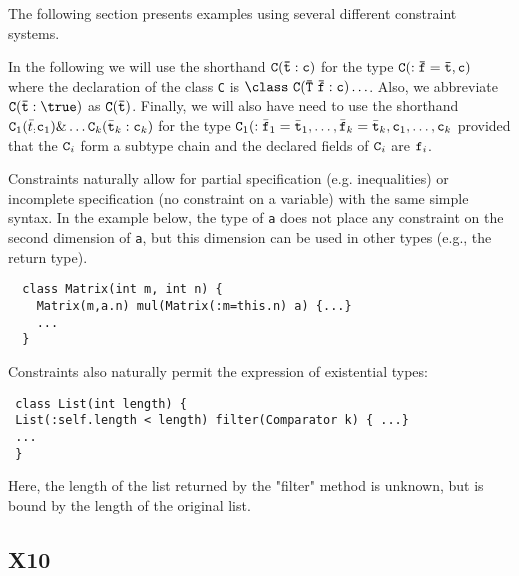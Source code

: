 %
%
%
%
%
%

The following section presents examples using several different
constraint systems.

In the following we will use the shorthand $\tt C(\bar{t}:c)$ for the
type $\tt C(:\bar{f}=\bar{t},c)$ where the declaration of the class
{\tt C} is $\tt \class\ C(\bar{\tt T}\ \bar{\tt f}:c)\ldots$.  Also,
we abbreviate $\tt C(\bar{t}:\true)$ as $\tt C(\bar{t})$.  Finally, we
will also have need to use the shorthand ${\tt C}_1(\bar{t}_:{\tt
c}_1)\& \ldots {\tt C}_k(\bar{\tt t}_k:{\tt c}_k)$ for the type
${\tt C}_1(:\bar{\tt f}_1=\bar{\tt t}_1, \ldots, \bar{\tt
f}_k=\bar{\tt t}_k,{\tt c}_1,\ldots,{\tt c}_k$ 
provided that the ${\tt C}_i$ form a subtype chain
and the declared fields of ${\tt C}_i$ are ${\tt f}_i$.

Constraints naturally allow for partial specification
(e.g. inequalities) or incomplete specification (no constraint on a
variable) with the same simple syntax. In the example below,
the type of {\tt a} does not place any constraint on the second
dimension of {\tt a}, but this dimension can be used in other
types (e.g., the return type).
{\footnotesize
\begin{verbatim}
  class Matrix(int m, int n) {
    Matrix(m,a.n) mul(Matrix(:m=this.n) a) {...}
    ...
  }
\end{verbatim}}

Constraints also naturally permit the expression of existential types:
{\footnotesize
\begin{verbatim}
 class List(int length) { 
 List(:self.length < length) filter(Comparator k) { ...} 
 ...
 }
\end{verbatim}}
\noindent
Here, the length of the list returned by the "filter" method is 
unknown, but is bound by the length of the original list.

\subsection{X10}


